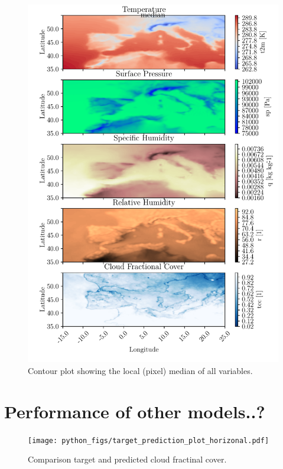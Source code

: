 \begin{figure}[ht]
    \centering
    \includegraphics{python_figs/contourplot_all_variables_median.pdf}
    \caption{Contour plot showing the local (pixel) median of all variables.}
    \label{fig:contour_mean_all_vars}
\end{figure}




\cleardoublepage

\chapter{Performance of other models..?}

\begin{figure}[ht]
    \centering
    \texttt{[image: python\_figs/target\_prediction\_plot\_horizonal.pdf]}
    \caption{Comparison target and predicted cloud fractinal cover.}
    \label{fig:target_predict_horizontal}
\end{figure}

